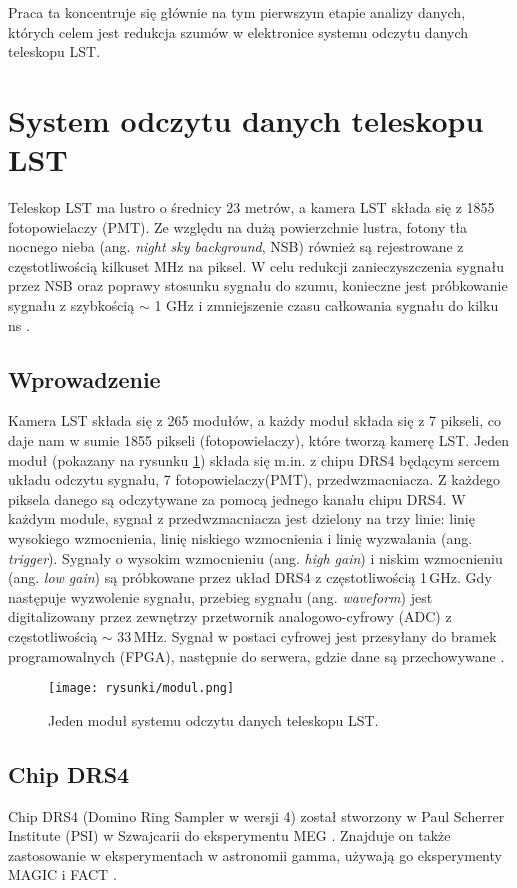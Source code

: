 \documentclass[a4paper,11pt,twoside]{article}
\begin{document}
Praca ta koncentruje się głównie na tym pierwszym etapie analizy danych, których celem jest redukcja szumów w elektronice systemu odczytu danych teleskopu LST. 

\newpage
\section{System odczytu danych teleskopu LST}
Teleskop LST  ma lustro o średnicy 23 metrów, a kamera LST składa się z 1855 fotopowielaczy (PMT). Ze względu na dużą powierzchnie lustra, fotony tła nocnego nieba (ang. \textsl{night sky background}, NSB) również są rejestrowane z częstotliwością kilkuset MHz na piksel. W celu redukcji zanieczyszczenia sygnału przez NSB oraz poprawy stosunku sygnału do szumu, konieczne jest próbkowanie  sygnału z szybkością $\sim$ 1 GHz i zmniejszenie czasu całkowania sygnału do kilku ns \cite{dragon_lst}.
\subsection{Wprowadzenie}
Kamera LST składa się z 265 modułów, a każdy moduł składa się z 7 pikseli, co daje nam w sumie 1855 pikseli (fotopowielaczy), które tworzą kamerę LST. Jeden moduł (pokazany na rysunku \ref{fig:drs4}) składa się m.in. z chipu DRS4 będącym sercem układu odczytu sygnału, 7 fotopowielaczy(PMT), przedwzmacniacza.
Z każdego piksela danego są odczytywane za pomocą jednego kanału chipu DRS4. W każdym module, sygnał z przedwzmacniacza jest dzielony na trzy linie: linię wysokiego wzmocnienia, linię niskiego wzmocnienia i linię wyzwalania (ang. \textsl{trigger}). Sygnały o wysokim wzmocnieniu (ang. \textsl{high gain}) i niskim wzmocnieniu (ang. \textsl{low gain}) są próbkowane przez układ DRS4 z częstotliwością 1\,GHz. Gdy następuje wyzwolenie sygnału, przebieg sygnału (ang. \textsl{waveform}) jest digitalizowany przez zewnętrzy przetwornik analogowo-cyfrowy (ADC) z częstotliwością $\sim$ 33\,MHz. Sygnał w postaci cyfrowej jest przesyłany do bramek programowalnych (FPGA), następnie do serwera, gdzie dane są przechowywane \cite{dragon_lst}. 
\begin{figure}[H] 
\centering
\texttt{[image: rysunki/modul.png]}
\caption{Jeden moduł systemu odczytu danych teleskopu LST.}
\label{fig:drs4}
\end{figure}
\subsection{Chip DRS4}
Chip DRS4 (Domino Ring Sampler w wersji 4) został stworzony w Paul Scherrer Institute (PSI) w Szwajcarii do eksperymentu MEG \cite{meg_experiment}.
Znajduje on także zastosowanie w eksperymentach w astronomii gamma, używają go eksperymenty MAGIC i FACT \cite{drs4_magic}.
\end{document}
